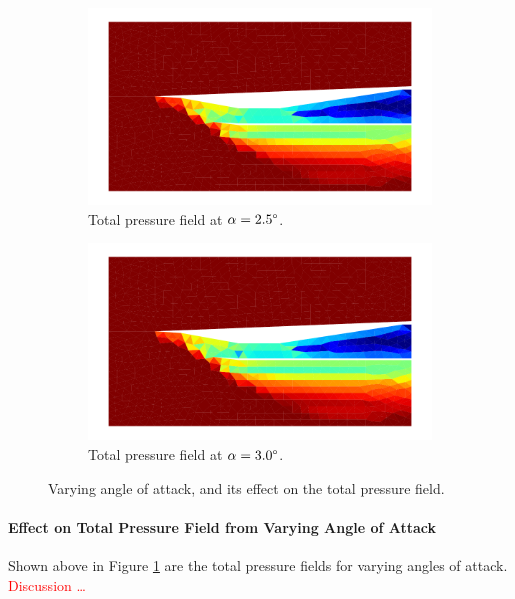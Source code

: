 \begin{figure}[h]
    \begin{subfigure}[h]{0.48\linewidth}
        \centering
        \includegraphics[width=\linewidth]{rep/q5/pt_a25.pdf}
        \caption{Total pressure field at $\alpha=2.5\degree$.}
    \end{subfigure}
    \begin{subfigure}[h]{0.48\linewidth}
        \centering
        \includegraphics[width=\linewidth]{rep/q5/pt_a30.pdf}
        \caption{Total pressure field at $\alpha=3.0\degree$.}
    \end{subfigure}
    \caption[Total Pressure Field with Varying Angle of Attack]{Varying angle of attack, and its effect on the total pressure field.}
    \label{fig:pt_fields}
\end{figure}

\paragraph{Effect on Total Pressure Field from Varying Angle of Attack} Shown above in Figure \ref{fig:pt_fields} are the total pressure fields for varying angles of attack. \textcolor{red}{Discussion \ldots}


